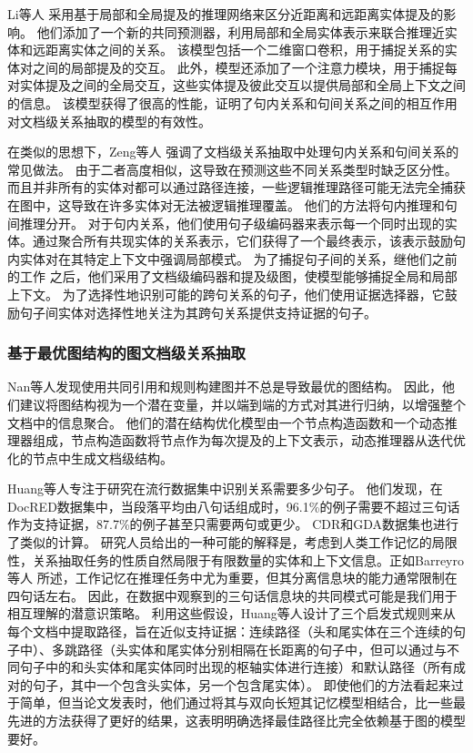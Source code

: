 \documentclass[bachelor]{thesis-uestc}
\begin{document}
Li等人 采用基于局部和全局提及的推理网络来区分近距离和远距离实体提及的影响。
他们添加了一个新的共同预测器，利用局部和全局实体表示来联合推理近实体和远距离实体之间的关系。
该模型包括一个二维窗口卷积，用于捕捉关系的实体对之间的局部提及的交互。
此外，模型还添加了一个注意力模块，用于捕捉每对实体提及之间的全局交互，这些实体提及彼此交互以提供局部和全局上下文之间的信息。
该模型获得了很高的性能，证明了句内关系和句间关系之间的相互作用对文档级关系抽取的模型的有效性。\par

在类似的思想下，Zeng等人 强调了文档级关系抽取中处理句内关系和句间关系的常见做法。
由于二者高度相似，这导致在预测这些不同关系类型时缺乏区分性。
而且并非所有的实体对都可以通过路径连接，一些逻辑推理路径可能无法完全捕获在图中，这导致在许多实体对无法被逻辑推理覆盖。
他们的方法将句内推理和句间推理分开。
对于句内关系，他们使用句子级编码器来表示每一个同时出现的实体。通过聚合所有共现实体的关系表示，它们获得了一个最终表示，该表示鼓励句内实体对在其特定上下文中强调局部模式。
为了捕捉句子间的关系，继他们之前的工作 \cite{GAIN}之后，他们采用了文档级编码器和提及级图，使模型能够捕捉全局和局部上下文。
为了选择性地识别可能的跨句关系的句子，他们使用证据选择器，它鼓励句子间实体对选择性地关注为其跨句关系提供支持证据的句子。\par

\subsubsection{基于最优图结构的图文档级关系抽取}\label{subsec:optimal-graph}

Nan等人发现使用共同引用和规则构建图并不总是导致最优的图结构。
因此，他们建议将图结构视为一个潜在变量，并以端到端的方式对其进行归纳，以增强整个文档中的信息聚合。
他们的潜在结构优化模型由一个节点构造函数和一个动态推理器组成，节点构造函数将节点作为每次提及的上下文表示，动态推理器从迭代优化的节点中生成文档级结构。\par

Huang等人专注于研究在流行数据集中识别关系需要多少句子。
他们发现，在DocRED数据集中，当段落平均由八句话组成时，96.1\%的例子需要不超过三句话作为支持证据，87.7\%的例子甚至只需要两句或更少。
CDR和GDA数据集也进行了类似的计算。
研究人员给出的一种可能的解释是，考虑到人类工作记忆的局限性，关系抽取任务的性质自然局限于有限数量的实体和上下文信息。正如Barreyro等人 所述，工作记忆在推理任务中尤为重要，但其分离信息块的能力通常限制在四句话左右。
因此，在数据中观察到的三句话信息块的共同模式可能是我们用于相互理解的潜意识策略。
利用这些假设，Huang等人设计了三个启发式规则来从每个文档中提取路径，旨在近似支持证据：连续路径（头和尾实体在三个连续的句子中）、多跳路径（头实体和尾实体分别相隔在长距离的句子中，但可以通过与不同句子中的和头实体和尾实体同时出现的枢轴实体进行连接）和默认路径（所有成对的句子，其中一个包含头实体，另一个包含尾实体）。
即使他们的方法看起来过于简单，但当论文发表时，他们通过将其与双向长短其记忆模型相结合，比一些最先进的方法获得了更好的结果，这表明明确选择最佳路径比完全依赖基于图的模型要好。\par
\end{document}
